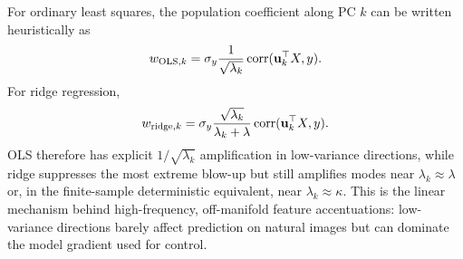 For ordinary least squares, the population coefficient along PC $k$ can be written heuristically as
\begin{equation}
    w_{\mathrm{OLS},k}
    =
    \sigma_y\frac{1}{\sqrt{\lambda_k}}
    \operatorname{corr}(\mathbf{u}_k^\top X,y).
\end{equation}
For ridge regression,
\begin{equation}
    w_{\mathrm{ridge},k}
    =
    \sigma_y
    \frac{\sqrt{\lambda_k}}{\lambda_k+\lambda}
    \operatorname{corr}(\mathbf{u}_k^\top X,y).
\end{equation}
OLS therefore has explicit $1/\sqrt{\lambda_k}$ amplification in low-variance directions, while ridge suppresses the most extreme blow-up but still amplifies modes near $\lambda_k\approx\lambda$ or, in the finite-sample deterministic equivalent, near $\lambda_k\approx\kappa$. This is the linear mechanism behind high-frequency, off-manifold feature accentuations: low-variance directions barely affect prediction on natural images but can dominate the model gradient used for control.
